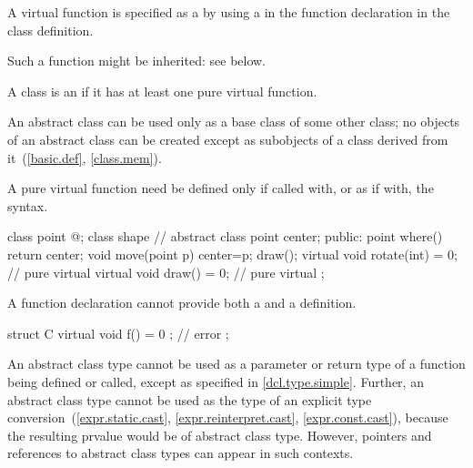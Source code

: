 \pnum
A virtual function is specified as
a  by using a
 in the function declaration
in the class definition.
\begin{note}
Such a function might be inherited: see below.
\end{note}
A class is an 
if it has at least one pure virtual function.
\begin{note}
An abstract class can be used only as a base class of some other class;
no objects of an abstract class can be created
except as subobjects of a class
derived from it~(\ref{basic.def}, \ref{class.mem}).
\end{note}
%
A pure virtual function need be defined only if called with, or as if
with, the 
syntax.
\begin{example}
\begin{codeblock}
class point { @\commentellip@ };
class shape {                   // abstract class
  point center;
public:
  point where() { return center; }
  void move(point p) { center=p; draw(); }
  virtual void rotate(int) = 0; // pure virtual
  virtual void draw() = 0;      // pure virtual
};
\end{codeblock}
\end{example}
\begin{note}
A function declaration cannot provide both a 
and a definition.
\end{note}
\begin{example}
\begin{codeblock}
struct C {
  virtual void f() = 0 { };     // error
};
\end{codeblock}
\end{example}

\pnum
\begin{note}
An abstract class type cannot be used
as a parameter or return type of
a function being defined or called,
except as specified in \ref{dcl.type.simple}.
Further, an abstract class type cannot be used as
the type of an explicit type conversion~(\ref{expr.static.cast},
\ref{expr.reinterpret.cast}, \ref{expr.const.cast}),
because the resulting prvalue would be of abstract class type.
However, pointers and references to abstract class types
can appear in such contexts.
\end{note}

